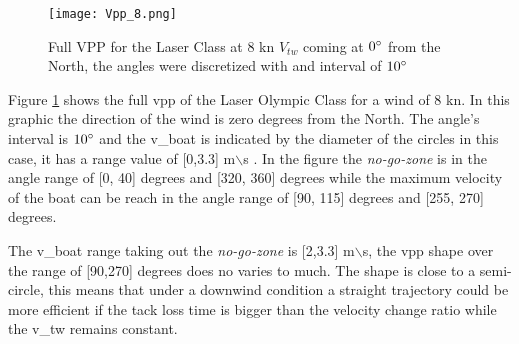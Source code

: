 \begin{figure}[hbt!]
    \centering
    \texttt{[image: Vpp\_8.png]}
    \caption{Full VPP for the Laser Class at 8 kn $V_{tw}$ coming at $0\degree$ from the North, the angles were discretized with and interval of $10\degree$} 
    \label{fig:Laser_Full_Vpp85}
\end{figure}
Figure \ref{fig:Laser_Full_Vpp85} shows the full \acrshort{vpp} of the Laser Olympic Class for a wind of 8 kn. In this graphic the direction of the wind is zero degrees from the North. The angle's interval is $10\degree$ and the \acrshort{v_boat} is indicated by the diameter of the circles in this case, it has a range value of [0,3.3] m$\backslash$s . In the figure the \textit{no-go-zone} is in the angle range of [0, 40] degrees and [320, 360] degrees while the maximum velocity of the boat can be reach in the angle range of [90, 115] degrees and [255, 270] degrees. \par 
\noindent
The \acrshort{v_boat} range taking out the \textit{no-go-zone} is [2,3.3] m$\backslash$s, the \acrshort{vpp} shape over the range of [90,270] degrees does no varies to much. The shape is close to a semi-circle, this means that under a downwind condition a straight trajectory could be more efficient if the tack loss time is bigger than the velocity change ratio while the \acrshort{v_tw} remains constant.  \par  

